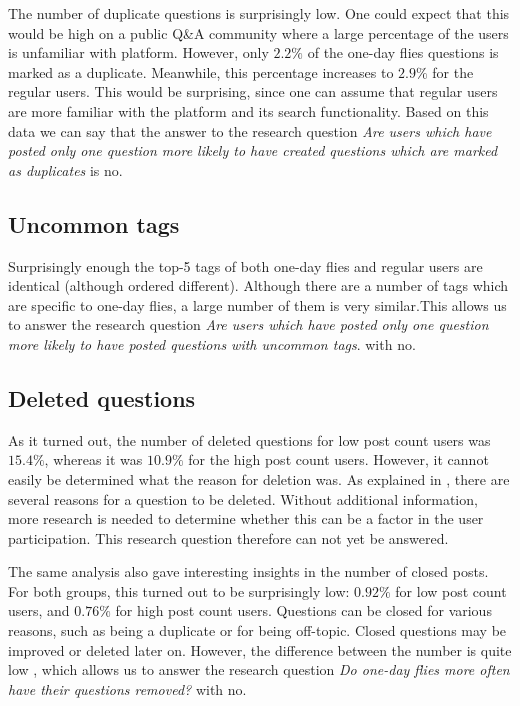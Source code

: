 \documentclass[conference]{IEEEtran}
\begin{document}
The number of duplicate questions is surprisingly low. One could expect that
this would be high on a public Q\&A community where a large percentage of the
users is unfamiliar with platform. However, only $2.2\%$ of the one-day flies
questions is marked as a duplicate. Meanwhile, this percentage increases to
$2.9\%$ for the regular users. This would be surprising, since one can assume
that regular users are more familiar with the platform and its search
functionality. Based on this data we can say that the answer to the research
question \textit{Are users which have posted only one question more likely to
have created questions which are marked as duplicates} is no.

\subsection{Uncommon tags}

Surprisingly enough the top-5 tags of both one-day flies and regular users are
identical (although ordered different). Although there are a number of tags
which are specific to one-day flies, a large number of them is very
similar.This allows us to answer the research question \textit{Are users which
have posted only one question more likely to have posted questions with
uncommon tags}. with no.

\subsection{Deleted questions}
As it turned out, the number of deleted questions for low post count users was
$15.4\%$, whereas it was $10.9\%$ for the high post count users. However, it
cannot easily be determined what the reason for deletion was. As explained in
\cite{correa2014chaff}, there are several reasons for a question to be deleted.
Without additional information, more research is needed to determine whether
this can be a factor in the user participation. This research question
therefore can not yet be answered.

The same analysis also gave interesting insights in the number of closed posts.
For both groups, this turned out to be surprisingly low: $0.92\%$ for low post
count users, and $0.76\%$ for high post count users. Questions can be closed
for various reasons, such as being a duplicate or for being off-topic. Closed
questions may be improved or deleted later on. However, the difference between
the number is quite low , which allows us to answer the research question
\textit{Do one-day flies more often have their questions removed?} with no.
\end{document}
